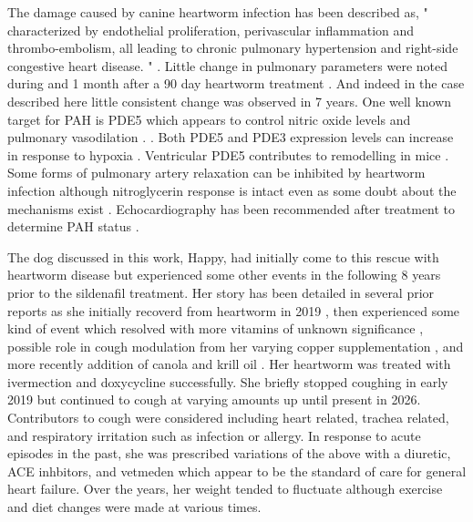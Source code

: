 The damage caused by canine heartworm infection has
been described as, "
characterized by endothelial proliferation,
perivascular inflammation and thrombo-embolism, all
leading to chronic pulmonary hypertension and right-side
congestive heart disease. 
"
\cite{Carreton_Grandi_Morchon_Myocardial_damage_dogs_2012}.
Little change in pulmonary parameters were noted during
and 1 month after a 90 day heartworm treatment 
\cite{SerranoParreno_Carreton_CaroVadillo_Pulmonary_hypertension_dogs_2017}.
And indeed in the case described here  little consistent change was observed
in 7 years. 
One well known target for PAH is PDE5 which 
appears to control nitric oxide levels and pulmonary
vasodilation
\cite{Ghofrani_PepkeZaba_Barbera_Nitric_oxide_pathway_2004}.
. Both PDE5 and PDE3 expression levels can increase in response
to hypoxia \cite{https://doi.org/10.1038/sj.bjp.0704984}.
Ventricular PDE5 contributes to remodelling  in mice 
\cite{Verbeken_Sipido_Herijgers_Ventricular_Phosphodiesterase_Expression_2009}.
Some forms of pulmonary artery relaxation can be inhibited by heartworm
infection although nitroglycerin response is intact even as some
doubt about the mechanisms exist
\cite{Mupanomunda_Williams_Mackenzie_Dirofilaria_immitis_heartworm_1997}.
Echocardiography has been recommended after treatment to determine
PAH status \cite{MAERZ2020109156}.



The dog discussed in this work, Happy, had initially come to this rescue
 with
heartworm disease but experienced some other events in the following
8 years prior to the sildenafil treatment.
Her story has been detailed in several
prior reports
as she initially recoverd from heartworm
in 2019
\cite{mmarchywka-MJM-2019-001-.1rg},
then experienced some kind of event which resolved
with more vitamins of unknown significance
\cite{marchywka-MJM-2022-009-0.50rg},
possible role  in cough modulation from her varying copper supplementation
\cite{marchywka-MJM-2024-010-0.01rg},
and more recently addition of canola and krill oil
\cite{marchywka-MJM-2025-004-0.50}.
Her heartworm  
was treated with ivermection and doxycycline successfully.
She briefly stopped coughing in early 2019 but continued
to cough at varying amounts up until present in 2026.
Contributors to cough were considered including heart related, 
trachea related, and respiratory irritation such as infection or allergy.
In response to acute episodes in the past, she was prescribed
variations of the above with a diuretic, ACE inhbitors, and vetmeden
which appear to be the standard of care for general heart failure.
Over the years, her weight tended to fluctuate although exercise and
diet changes were made at various times.  

